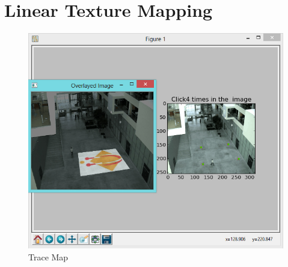 \section{Linear Texture Mapping}

\begin{figure}[h!]
	\centering
	\includegraphics[width=\textwidth]{Handin2/images/linearmapping.jpg}
	\caption{Trace Map}
	\label{fig:trace}
\end{figure}